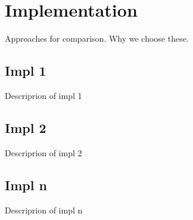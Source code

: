 \section{Implementation}

Approaches for comparison. Why we choose these.

\subsection{Impl 1}

Descriprion of impl 1

\subsection{Impl 2}

Descriprion of impl 2

\subsection{Impl n}

Descriprion of impl n

